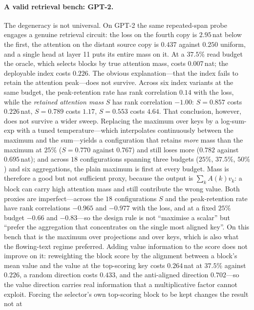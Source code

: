 \documentclass[sigconf,nonacm,11pt]{acmart}
\begin{document}
\paragraph{A valid retrieval bench: GPT-2.} The degeneracy is not universal. On GPT-2
the same repeated-span probe engages a genuine retrieval circuit: the loss on the
fourth copy is $2.95$\,nat below the first, the attention on the distant source copy
is $0.437$ against $0.250$ uniform, and a single head at layer 11 puts its entire mass
on it. At a $37.5\%$ read budget the oracle, which selects blocks by true attention
mass, costs $0.007$\,nat; the deployable index costs $0.226$. The obvious
explanation---that the index fails to retain the attention peak---does not survive.
Across six index variants at the same budget, the peak-retention rate has rank
correlation $0.14$ with the loss, while the \emph{retained attention mass} $S$ has
rank correlation $-1.00$: $S=0.857$ costs $0.226$\,nat, $S=0.789$ costs $1.17$,
$S=0.553$ costs $4.64$. That conclusion, however, does not survive a wider sweep.
Replacing the maximum over keys by a log-sum-exp with a tuned temperature---which
interpolates continuously between the maximum and the sum---yields a configuration
that retains \emph{more} mass than the maximum at $25\%$ ($S=0.770$ against
$0.767$) and still loses more ($0.782$ against $0.695$\,nat); and across $18$
configurations spanning three budgets ($25\%$, $37.5\%$, $50\%$) and six
aggregations, the plain maximum is first at every budget. Mass is therefore a good
but not sufficient proxy, because the output is $\sum_k A(k)v_k$: a block can carry
high attention mass and still contribute the wrong value. Both proxies are
imperfect---across the $18$ configurations $S$ and the peak-retention rate have rank
correlations $-0.965$ and $-0.977$ with the loss, and at a fixed $25\%$ budget
$-0.66$ and $-0.83$---so the design rule is not ``maximise a scalar'' but ``prefer
the aggregation that concentrates on the single most aligned key''. On this bench
that is the maximum over projections and over keys, which is also what the
flowing-text regime preferred. Adding value information to the score does not improve on it: reweighting the
block score by the alignment between a block's mean value and the value at the
top-scoring key costs $0.264$\,nat at $37.5\%$ against $0.226$, a random
direction costs $0.433$, and the anti-aligned direction $0.702$---so the value
direction carries real information that a multiplicative factor cannot exploit.
Forcing the selector's own top-scoring block to be kept changes the result not at
\end{document}
